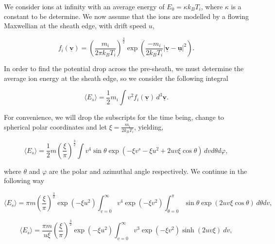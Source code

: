\documentclass{article}
\begin{document}
\medskip 

We consider ions at infinity with an average energy of $E_0 = \kappa k_B T_i$, where
$\kappa$ is a constant to be determine. We now assume that the ions are modelled by a flowing 
Maxwellian at the sheath edge, with drift speed $u$,

\begin{equation}\label{FlowingMaxwellian}
f_i(\underline{\mathbf{v}}) = \left(\frac{m_i}{2\pi k_B T_i}\right)^{\frac{3}{2}} 
\exp{\left(\frac{-m_i}{2k_B T_i}|\underline{\mathbf{v}} - \underline{\mathbf{u}}|^2\right)}.
\end{equation}

\smallskip

In order to find the potential drop across the pre-sheath,
we must determine the average ion energy at the sheath edge, so we consider the following 
integral 

\begin{equation}\label{eq:Int1}
\langle E_{s} \rangle = \frac{1}{2}m_i \int v^2f_i(\underline{\mathbf{v}}) \,d^3 \underline{\mathbf{v}}.
\end{equation}

\smallskip
    
For convenience, we will drop the subscripts for the time being,
change to spherical polar coordinates and let $\xi = \frac{m_i}{2k_B T_i}$, yielding,

\begin{equation}\label{eq:Int2}
\langle E_{s} \rangle = \frac{1}{2}m \left(\frac{\xi}{\pi}\right)^{\frac{3}{2}}
\int v^4 \sin{\theta}\exp{\left(-\xi v^s - \xi u^2 + 2uv \xi \cos{\theta}\right)} \,dv d\theta d\varphi,
\end{equation}

\noindent where $\theta$ and $\varphi$ are the polar and azimuthal angle respectively. We continue
in the following way

\begin{equation}\label{eq:Int3}
\langle E_{s} \rangle = \pi m \left(\frac{\xi}{\pi}\right)^{\frac{3}{2}} \exp{\left(- \xi u^2\right)}
\int_{v = 0}^{\infty} v^4\exp{\left(-\xi v^2\right)} \int_{\theta = 0}^{\pi} \sin{\theta}\exp{\left(2uv \xi \cos{\theta}\right)} \,d\theta dv,
\end{equation}

\begin{equation}\label{eq:Int4}
\langle E_{s} \rangle = \frac{\pi m}{u\xi} \left(\frac{\xi}{\pi}\right)^{\frac{3}{2}} \exp{\left(- \xi u^2\right)}
\int_{v = 0}^{\infty} v^3\exp{\left(-\xi v^2\right)}\sinh{\left(2uv\xi\right)} \ dv,
\end{equation}
\end{document}
